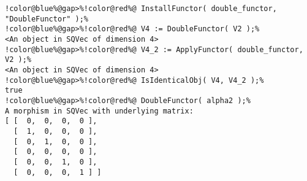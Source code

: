 \begin{Verbatim}[commandchars=!@\%,frame=single]
!color@blue%@gap>%!color@red%@ InstallFunctor( double_functor, "DoubleFunctor" );%
!color@blue%@gap>%!color@red%@ V4 := DoubleFunctor( V2 );%
<An object in SQVec of dimension 4>
!color@blue%@gap>%!color@red%@ V4_2 := ApplyFunctor( double_functor, V2 );%
<An object in SQVec of dimension 4>
!color@blue%@gap>%!color@red%@ IsIdenticalObj( V4, V4_2 );%
true
!color@blue%@gap>%!color@red%@ DoubleFunctor( alpha2 );%
A morphism in SQVec with underlying matrix:
[ [  0,  0,  0,  0 ],
  [  1,  0,  0,  0 ],
  [  0,  1,  0,  0 ],
  [  0,  0,  0,  0 ],
  [  0,  0,  1,  0 ],
  [  0,  0,  0,  1 ] ]

\end{Verbatim}
